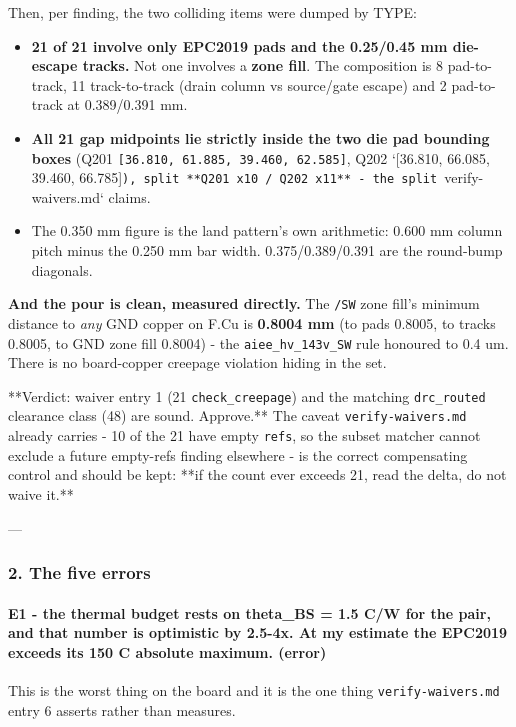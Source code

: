 \documentclass[11pt,a4paper]{article}
\begin{document}
Then, per finding, the two colliding items were dumped by TYPE:

\begin{itemize}
\item \textbf{21 of 21 involve only EPC2019 pads and the 0.25/0.45 mm die-escape tracks.}
Not one involves a \textbf{zone fill}. The composition is 8 pad-to-track,
11 track-to-track (drain column vs source/gate escape) and 2 pad-to-track at
0.389/0.391 mm.
\item \textbf{All 21 gap midpoints lie strictly inside the two die pad bounding boxes}
(Q201 \texttt{{[}36.810, 61.885, 39.460, 62.585{]}}, Q202 `{[}36.810, 66.085, 39.460,
66.785{]}\texttt{), split {*}{*}Q201 x10 / Q202 x11{*}{*} - the split }verify-waivers.md`
claims.
\item The 0.350 mm figure is the land pattern's own arithmetic: 0.600 mm column
pitch minus the 0.250 mm bar width. 0.375/0.389/0.391 are the round-bump
diagonals.
\end{itemize}
\textbf{And the pour is clean, measured directly.} The \texttt{/SW} zone fill's minimum distance to \emph{any} GND copper on F.Cu is \textbf{0.8004 mm} (to pads 0.8005, to tracks 0.8005, to GND zone fill 0.8004) - the \texttt{aiee\_hv\_143v\_SW} rule honoured to 0.4 um. There is no board-copper creepage violation hiding in the set.

{*}{*}Verdict: waiver entry 1 (21 \texttt{check\_creepage}) and the matching \texttt{drc\_routed} clearance class (48) are sound. Approve.{*}{*} The caveat \texttt{verify-waivers.md} already carries - 10 of the 21 have empty \texttt{refs}, so the subset matcher cannot exclude a future empty-refs finding elsewhere - is the correct compensating control and should be kept: {*}{*}if the count ever exceeds 21, read the delta, do not waive it.{*}{*}

---

\subsubsection*{2. The five errors}
\paragraph*{E1 - the thermal budget rests on theta\_BS = 1.5 C/W for the pair, and that number is optimistic by 2.5-4x. At my estimate the EPC2019 exceeds its 150 C absolute maximum. (error)}
This is the worst thing on the board and it is the one thing \texttt{verify-waivers.md} entry 6 asserts rather than measures.
\end{document}
